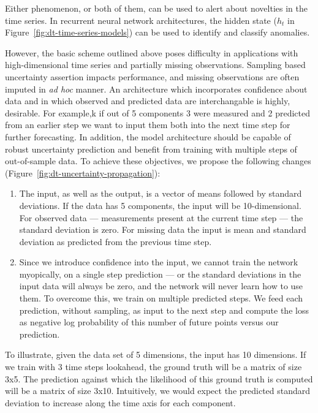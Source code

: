 \documentclass{paper}
\begin{document}
Either phenomenon, or both of them, can be used to alert about novelties in the time series. In recurrent neural network architectures, the hidden state ($h_t$ in Figure~\ref{fig:dt-time-series-models}) can be used to identify and classify anomalies.

However, the basic scheme outlined above poses difficulty in applications with high-dimensional time series and partially missing observations. Sampling based uncertainty assertion impacts performance, and missing observations are often imputed in \textit{ad hoc} manner. An architecture which
incorporates confidence about data and in which observed and
predicted data are interchangable is  highly, desirable. For example,k if out of 5 components 3 were
measured and 2 predicted from an earlier step we want to input
them both into the next time step for further forecasting. In
addition, the model architecture should be capable of robust uncertainty prediction and benefit from training with multiple steps of out-of-sample data. To achieve these objectives, we propose the following changes (Figure~\ref{fig:dt-uncertainty-propagation}):

\begin{enumerate}
\item The input, as well as the output, is a vector of means followed
by standard deviations. If the data has 5 components, the input
will be 10-dimensional. For observed data --- measurements
present at the current time step --- the standard deviation is
zero. For missing data the input is mean and standard deviation
as predicted from the previous time step.

\item Since we introduce confidence into the input, we cannot train
the network myopically, on a single step prediction --- or the
standard deviations in the input data will always be zero, and
the network will never learn how to use them. To overcome this,
we train on multiple predicted steps. We feed each prediction,
without sampling, as input to the next step and compute the loss
as negative log probability of this number of future points versus our prediction.
\end{enumerate}

To illustrate, given the data set of 5 dimensions, the input has 10
dimensions. If we train with 3 time steps lookahead, the ground
truth will be a matrix of size 3x5. The prediction against
which the likelihood of this ground truth is computed will be
a matrix of size 3x10. Intuitively, we would expect the
predicted standard deviation to increase along the time axis
for each component.
\end{document}
